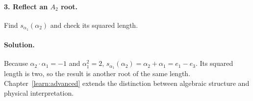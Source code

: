 \paragraph{3. Reflect an $A_2$ root.}
Find $s_{\alpha_1}(\alpha_2)$ and check its squared length.

\paragraph{Solution.}
Because $\alpha_2\cdot\alpha_1=-1$ and $\alpha_1^2=2$,
$s_{\alpha_1}(\alpha_2)=\alpha_2+\alpha_1=e_1-e_3$.
Its squared length is two, so the result is another root of the same length.
Chapter~\ref{learn:advanced} extends the distinction between algebraic
structure and physical interpretation.


